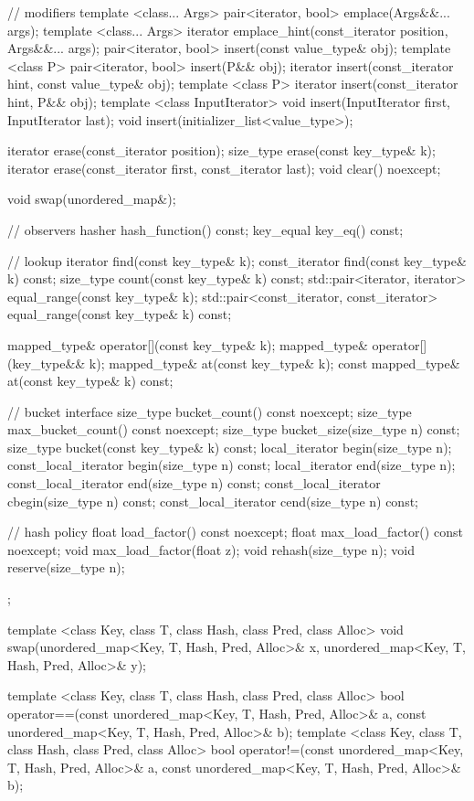 \begin{codeblock}
{{    // modifiers
    template <class... Args> pair<iterator, bool> emplace(Args&&... args);
    template <class... Args> iterator emplace_hint(const_iterator position, Args&&... args);
    pair<iterator, bool> insert(const value_type& obj);
    template <class P> pair<iterator, bool> insert(P&& obj);
    iterator       insert(const_iterator hint, const value_type& obj);
    template <class P> iterator insert(const_iterator hint, P&& obj);
    template <class InputIterator> void insert(InputIterator first, InputIterator last);
    void insert(initializer_list<value_type>);

    iterator erase(const_iterator position);
    size_type erase(const key_type& k);
    iterator erase(const_iterator first, const_iterator last);
    void clear() noexcept;

    void swap(unordered_map&);

    // observers
    hasher hash_function() const;
    key_equal key_eq() const;

    // lookup
    iterator       find(const key_type& k);
    const_iterator find(const key_type& k) const;
    size_type count(const key_type& k) const;
    std::pair<iterator, iterator>             equal_range(const key_type& k);
    std::pair<const_iterator, const_iterator> equal_range(const key_type& k) const;

    mapped_type& operator[](const key_type& k);
    mapped_type& operator[](key_type&& k);
    mapped_type& at(const key_type& k);
    const mapped_type& at(const key_type& k) const;

    // bucket interface
    size_type bucket_count() const noexcept;
    size_type max_bucket_count() const noexcept;
    size_type bucket_size(size_type n) const;
    size_type bucket(const key_type& k) const;
    local_iterator begin(size_type n);
    const_local_iterator begin(size_type n) const;
    local_iterator end(size_type n);
    const_local_iterator end(size_type n) const;
    const_local_iterator cbegin(size_type n) const;
    const_local_iterator cend(size_type n) const;

    // hash policy
    float load_factor() const noexcept;
    float max_load_factor() const noexcept;
    void max_load_factor(float z);
    void rehash(size_type n);
    void reserve(size_type n);
  };

  template <class Key, class T, class Hash, class Pred, class Alloc>
    void swap(unordered_map<Key, T, Hash, Pred, Alloc>& x,
              unordered_map<Key, T, Hash, Pred, Alloc>& y);

  template <class Key, class T, class Hash, class Pred, class Alloc>
    bool operator==(const unordered_map<Key, T, Hash, Pred, Alloc>& a,
                    const unordered_map<Key, T, Hash, Pred, Alloc>& b);
  template <class Key, class T, class Hash, class Pred, class Alloc>
    bool operator!=(const unordered_map<Key, T, Hash, Pred, Alloc>& a,
                    const unordered_map<Key, T, Hash, Pred, Alloc>& b);
}
\end{codeblock}

